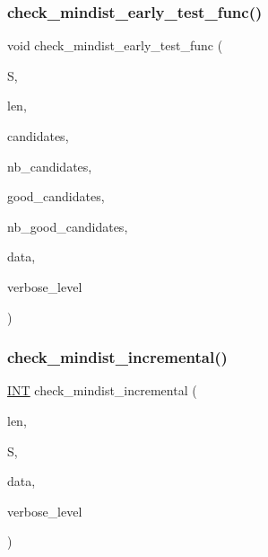 \subsubsection{\texorpdfstring{check\+\_\+mindist\+\_\+early\+\_\+test\+\_\+func()}{check\_mindist\_early\_test\_func()}}
{\footnotesize\ttfamily void check\+\_\+mindist\+\_\+early\+\_\+test\+\_\+func (\begin{DoxyParamCaption}\item[{\mbox{\hyperlink{galois_8h_a09fddde158a3a20bd2dcadb609de11dc}{I\+NT}} $\ast$}]{S,  }\item[{\mbox{\hyperlink{galois_8h_a09fddde158a3a20bd2dcadb609de11dc}{I\+NT}}}]{len,  }\item[{\mbox{\hyperlink{galois_8h_a09fddde158a3a20bd2dcadb609de11dc}{I\+NT}} $\ast$}]{candidates,  }\item[{\mbox{\hyperlink{galois_8h_a09fddde158a3a20bd2dcadb609de11dc}{I\+NT}}}]{nb\+\_\+candidates,  }\item[{\mbox{\hyperlink{galois_8h_a09fddde158a3a20bd2dcadb609de11dc}{I\+NT}} $\ast$}]{good\+\_\+candidates,  }\item[{\mbox{\hyperlink{galois_8h_a09fddde158a3a20bd2dcadb609de11dc}{I\+NT}} \&}]{nb\+\_\+good\+\_\+candidates,  }\item[{void $\ast$}]{data,  }\item[{\mbox{\hyperlink{galois_8h_a09fddde158a3a20bd2dcadb609de11dc}{I\+NT}}}]{verbose\+\_\+level }\end{DoxyParamCaption})}

\mbox{\label{code__generator_8_c_aecafcba0106d72bc644cf87a6ed937e5}} 
\subsubsection{\texorpdfstring{check\+\_\+mindist\+\_\+incremental()}{check\_mindist\_incremental()}}
{\footnotesize\ttfamily \mbox{\hyperlink{galois_8h_a09fddde158a3a20bd2dcadb609de11dc}{I\+NT}} check\+\_\+mindist\+\_\+incremental (\begin{DoxyParamCaption}\item[{\mbox{\hyperlink{galois_8h_a09fddde158a3a20bd2dcadb609de11dc}{I\+NT}}}]{len,  }\item[{\mbox{\hyperlink{galois_8h_a09fddde158a3a20bd2dcadb609de11dc}{I\+NT}} $\ast$}]{S,  }\item[{void $\ast$}]{data,  }\item[{\mbox{\hyperlink{galois_8h_a09fddde158a3a20bd2dcadb609de11dc}{I\+NT}}}]{verbose\+\_\+level }\end{DoxyParamCaption})}

